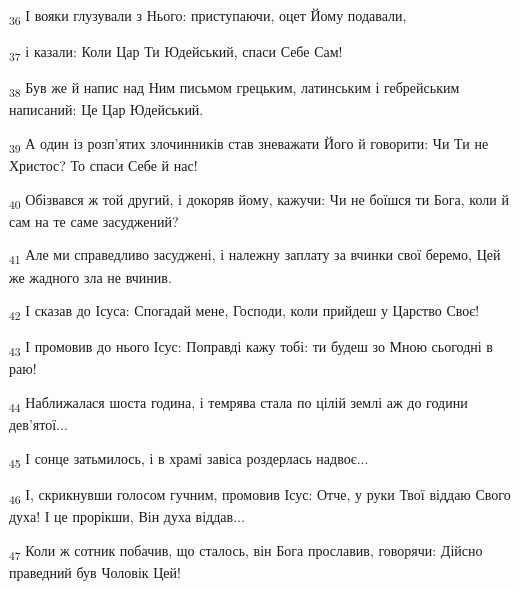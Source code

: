 \begin{tcolorbox}
\textsubscript{36} І вояки глузували з Нього: приступаючи, оцет Йому подавали,
\end{tcolorbox}
\begin{tcolorbox}
\textsubscript{37} і казали: Коли Цар Ти Юдейський, спаси Себе Сам!
\end{tcolorbox}
\begin{tcolorbox}
\textsubscript{38} Був же й напис над Ним письмом грецьким, латинським і гебрейським написаний: Це Цар Юдейський.
\end{tcolorbox}
\begin{tcolorbox}
\textsubscript{39} А один із розп'ятих злочинників став зневажати Його й говорити: Чи Ти не Христос? То спаси Себе й нас!
\end{tcolorbox}
\begin{tcolorbox}
\textsubscript{40} Обізвався ж той другий, і докоряв йому, кажучи: Чи не боїшся ти Бога, коли й сам на те саме засуджений?
\end{tcolorbox}
\begin{tcolorbox}
\textsubscript{41} Але ми справедливо засуджені, і належну заплату за вчинки свої беремо, Цей же жадного зла не вчинив.
\end{tcolorbox}
\begin{tcolorbox}
\textsubscript{42} І сказав до Ісуса: Спогадай мене, Господи, коли прийдеш у Царство Своє!
\end{tcolorbox}
\begin{tcolorbox}
\textsubscript{43} І промовив до нього Ісус: Поправді кажу тобі: ти будеш зо Мною сьогодні в раю!
\end{tcolorbox}
\begin{tcolorbox}
\textsubscript{44} Наближалася шоста година, і темрява стала по цілій землі аж до години дев'ятої...
\end{tcolorbox}
\begin{tcolorbox}
\textsubscript{45} І сонце затьмилось, і в храмі завіса роздерлась надвоє...
\end{tcolorbox}
\begin{tcolorbox}
\textsubscript{46} І, скрикнувши голосом гучним, промовив Ісус: Отче, у руки Твої віддаю Свого духа! І це прорікши, Він духа віддав...
\end{tcolorbox}
\begin{tcolorbox}
\textsubscript{47} Коли ж сотник побачив, що сталось, він Бога прославив, говорячи: Дійсно праведний був Чоловік Цей!
\end{tcolorbox}

